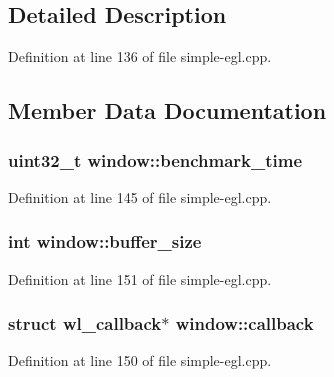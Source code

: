 \subsection{Detailed Description}


Definition at line 136 of file simple-\/egl.\+cpp.



\subsection{Member Data Documentation}
\subsubsection[{\texorpdfstring{benchmark\+\_\+time}{benchmark_time}}]{\setlength{\rightskip}{0pt plus 5cm}uint32\+\_\+t window\+::benchmark\+\_\+time}\hypertarget{structwindow_a72629bf021a361ad900504732a74cb68}{}\label{structwindow_a72629bf021a361ad900504732a74cb68}


Definition at line 145 of file simple-\/egl.\+cpp.

\subsubsection[{\texorpdfstring{buffer\+\_\+size}{buffer_size}}]{\setlength{\rightskip}{0pt plus 5cm}int window\+::buffer\+\_\+size}\hypertarget{structwindow_a0e634038f669aff472012f25ea250b40}{}\label{structwindow_a0e634038f669aff472012f25ea250b40}


Definition at line 151 of file simple-\/egl.\+cpp.

\subsubsection[{\texorpdfstring{callback}{callback}}]{\setlength{\rightskip}{0pt plus 5cm}struct wl\+\_\+callback$\ast$ window\+::callback}\hypertarget{structwindow_a35ba639556fa19d9273dad0953a6807e}{}\label{structwindow_a35ba639556fa19d9273dad0953a6807e}


Definition at line 150 of file simple-\/egl.\+cpp.

